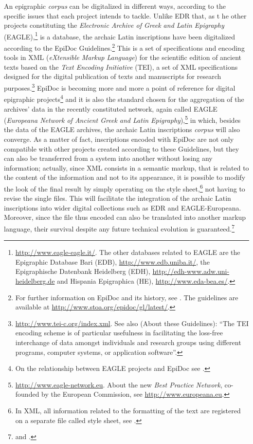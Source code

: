 \documentclass[amsthm,ebook]{saparticle}
\begin{document}
\noindent An epigraphic \emph{corpus} can be digitalized in different ways, according to the specific issues that each project intends to
tackle. Unlike EDR that, as t	he other projects constituting the \emph{Electronic Archive of Greek and Latin Epigraphy}
(EAGLE),\footnote{\url{http://www.eagle-eagle.it/}. The other databases related to EAGLE are the Epigraphic Database Bari
(EDB), \url{http://www.edb.uniba.it/}, the Epigraphische Datenbank Heidelberg (EDH),
\url{http://edh-www.adw.uni-heidelberg.de} and Hispania Epigraphica (HE),
\url{http://www.eda-bea.es/}.} is a database, the archaic Latin inscriptions have been digitalized according to the EpiDoc
Guidelines.\footnote{For further information on EpiDoc and its history, see \citet{Elliot:2006aa}.
The guidelines are available at \url{http://www.stoa.org/epidoc/gl/latest/}.} This is a set of specifications and encoding
tools in XML (\emph{eXtensible Markup Language}) for the scientific edition of ancient texts based on the \emph{Text Encoding Initiative} (TEI), a set of XML specifications designed for the digital publication of texts and manuscripts for
research purposes.\footnote{\url{http://www.tei-c.org/index.xml}. See also \citet{Consortium:2008aa} (About these Guidelines):
``The TEI encoding scheme is of particular usefulness in facilitating the loss-free interchange of data amongst
individuals and research groups using different programs, computer systems, or application software''.} EpiDoc is
becoming more and more a point of reference for digital epigraphic projects\footnote{On the relationship between EAGLE
projects and EpiDoc see \citet{felle_esperienze_2012}.} and it is also the standard chosen for the aggregation of the archives' data in
the recently constituted network, again called EAGLE (\emph{Europeana Network of Ancient Greek and Latin
Epigraphy}),\footnote{\url{http://www.eagle-network.eu}. About the new \emph{Best Practice Network}, co-founded by the European
Commission, see \url{http://www.europeana.eu}.} in which, besides the data of the EAGLE archives, the archaic Latin
inscriptions \emph{corpus} will also converge. As a matter of fact, inscriptions encoded with EpiDoc are not only compatible
with other projects created according to these Guidelines, but they can also be transferred from a system into another
without losing any information; actually, since XML consists in a semantic markup, that is related to the content of
the information and not to its appearance, it is possible to modify the look of the final result by simply operating on
the style sheet,\footnote{In XML, all information related to the formatting of the text are registered on a separate
file called style sheet, see \citet[104, 110-111]{bodard_epidoc:_2009}.} not having to revise the single files. This will facilitate
the integration of the archaic Latin inscriptions into wider digital collections such as EDR and EAGLE-Europeana.
Moreover, since the file thus encoded can also be translated into another markup language, their survival despite any
future technical evolution is guaranteed.\footnote{\citet[37-38]{tissoni_epidoc_2008} and \citet[104-105]{bodard_epidoc:_2009}.}
\end{document}
